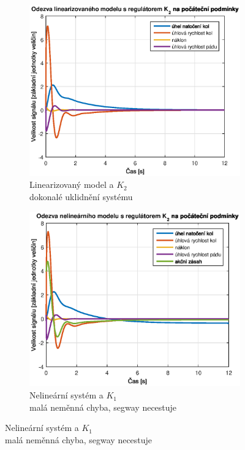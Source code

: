 \documentclass[conference]{IEEEtran}
\begin{document}
\begin{figure}[htbp]
    \centering %
    \begin{subfigure}{0.45\textwidth} 
        \centerline{\includegraphics[width=\linewidth]{stavova_K2_lin.eps}}
        \caption{Linearizovaný model a $K_2$ \\ dokonalé uklidnění systému}
        \label{fig:stavova_K2_lin}        
    \end{subfigure}\hfil
    \begin{subfigure}{0.45\textwidth}
        \centerline{\includegraphics[width=\linewidth]{stavova_K2_nelin.eps}}
        \caption{Nelineární systém a $K_1$ \\ malá neměnná chyba, segway necestuje}
        \label{fig:stavova_K2_nelin}        
    \end{subfigure}\hfil


\end{figure}
\end{document}
